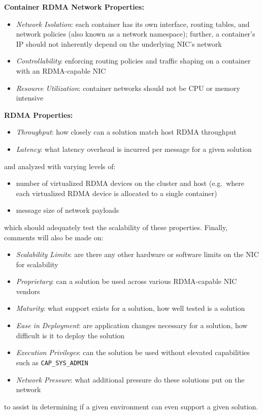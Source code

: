 \documentclass[12pt,titlepage]{article}
\begin{document}
\noindent
\textbf{Container RDMA Network Properties:}
\begin{itemize}[nolistsep]
	\item \textit{Network Isolation}: each container has its own interface, routing tables, and network policies (also known as a network namespace); further, a container's IP should not inherently depend on the underlying NIC's network
	\item \textit{Controllability}: enforcing routing policies and traffic shaping on a container with an RDMA-capable NIC
	\item \textit{Resource Utilization}: container networks should not be CPU or memory intensive
\end{itemize}

\noindent
\textbf{RDMA Properties:}
\begin{itemize}[nolistsep]
	\item \textit{Throughput}: how closely can a solution match host RDMA throughput
	\item \textit{Latency}: what latency overhead is incurred per message for a given solution
\end{itemize}

\noindent
and analyzed with varying levels of:
\begin{itemize}[nolistsep]
	\item number of virtualized RDMA devices on the cluster and host (e.g.\ where each virtualized RDMA device is allocated to a single container)
	\item message size of network payloads
\end{itemize}
which should adequately test the scalability of these properties.
Finally, comments will also be made on:
\begin{itemize}[nolistsep]
	\item \textit{Scalability Limits}: are there any other hardware or software limits on the NIC for scalability
	\item \textit{Proprietary}: can a solution be used across various RDMA-capable NIC vendors
	\item \textit{Maturity}: what support exists for a solution, how well tested is a solution
	\item \textit{Ease in Deployment}: are application changes necessary for a solution, how difficult is it to deploy the solution
	\item \textit{Execution Privileges}: can the solution be used without elevated capabilities such as \texttt{CAP\_SYS\_ADMIN}
	\item \textit{Network Pressure}: what additional pressure do these solutions put on the network
\end{itemize}
to assist in determining if a given environment can even support a given solution.
\end{document}
